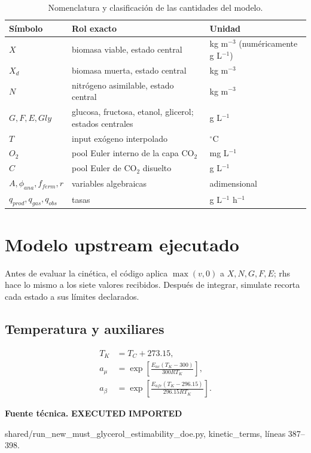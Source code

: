\documentclass[11pt]{article}
\newcommand{\E}[1]{%
  \nobreak\hspace{0.16em}%
  \begingroup
  \setlength{\fboxsep}{1.5pt}%
  \colorbox{auditpale}{\textcolor{auditblue}{\sffamily\bfseries\scriptsize #1}}%
  \endgroup\hspace{0.16em}%
}
\newcommand{\code}[1]{{\small\ttfamily #1}}
\newcommand{\sourceinfo}[1]{%
  \par\vspace{-0.15em}%
  {\small\color{auditslate}\sffamily\textbf{Fuente técnica.}\enspace #1\par}%
  \vspace{0.25em}%
}
\newcommand{\tablehead}[1]{\textcolor{auditblue}{\sffamily\bfseries #1}}
\begin{document}
\begin{table}[H]
\centering
\caption{Nomenclatura y clasificación de las cantidades del modelo.}
\label{tab:nomenclatura}
\begin{tabularx}{\textwidth}{>{\raggedright\arraybackslash}p{}Y>{\raggedright\arraybackslash}p{0.25\textwidth}}
\toprule
\tablehead{Símbolo} & \tablehead{Rol exacto} & \tablehead{Unidad} \\
\midrule
$X$ & biomasa viable, estado central & kg m$^{-3}$ (numéricamente g L$^{-1}$) \\
$X_d$ & biomasa muerta, estado central & kg m$^{-3}$ \\
$N$ & nitrógeno asimilable, estado central & kg m$^{-3}$ \\
$G,F,E,Gly$ & glucosa, fructosa, etanol, glicerol; estados centrales & g L$^{-1}$ \\
$T$ & input exógeno interpolado & $^\circ$C \\
$O_2$ & pool Euler interno de la capa CO$_2$ & mg L$^{-1}$ \\
$C$ & pool Euler de CO$_2$ disuelto & g L$^{-1}$ \\
$A,\phi_{ana},f_{ferm},r$ & variables algebraicas & adimensional \\
$q_{prod},q_{gas},q_{obs}$ & tasas & g L$^{-1}$ h$^{-1}$ \\
\bottomrule
\end{tabularx}
\end{table}

\section{Modelo upstream ejecutado}

Antes de evaluar la cinética, el código aplica $\max(v,0)$ a $X,N,G,F,E$;
\code{rhs} hace lo mismo a los siete valores recibidos. Después de integrar,
\code{simulate} recorta cada estado a sus límites declarados.

\subsection{Temperatura y auxiliares}

\begin{align}
T_K &= T_C+273.15, \tag{R01}\\
a_\mu&=\exp\!\left[\frac{E_{ac}(T_K-300)}{300RT_K}\right], \tag{R02}\\
a_\beta&=\exp\!\left[\frac{E_{afe}(T_K-296.15)}{296.15RT_K}\right]. \tag{R03}
\end{align}
\sourceinfo{\E{EXECUTED}\E{IMPORTED}
\code{shared/run\_new\_must\_glycerol\_estimability\_doe.py},
\code{kinetic\_terms}, líneas 387--398.}
\end{document}
